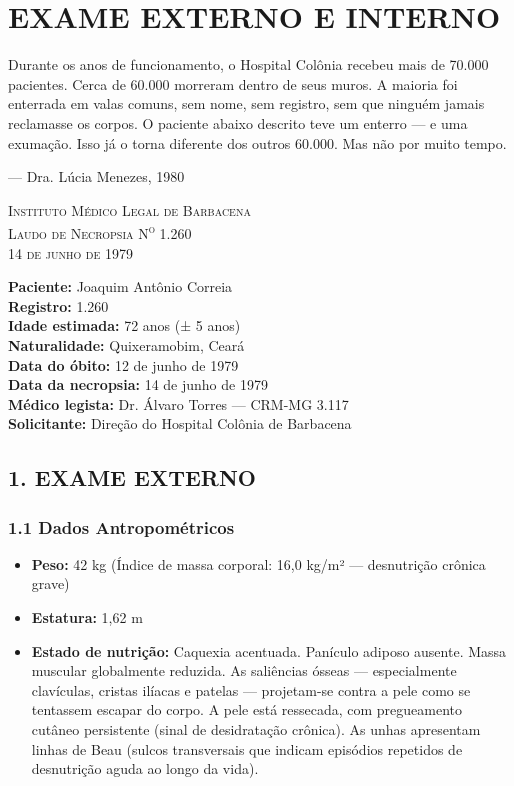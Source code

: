 \chapter{EXAME EXTERNO E INTERNO}

\epigraph{Durante os anos de funcionamento, o Hospital Colônia recebeu mais de 70.000 pacientes. Cerca de 60.000 morreram dentro de seus muros. A maioria foi enterrada em valas comuns, sem nome, sem registro, sem que ninguém jamais reclamasse os corpos. O paciente abaixo descrito teve um enterro --- e uma exumação. Isso já o torna diferente dos outros 60.000. Mas não por muito tempo.}{--- Dra. Lúcia Menezes, 1980}

\vspace{1em}
\begin{center}
\textsc{Instituto Médico Legal de Barbacena} \\
\textsc{Laudo de Necropsia N\textsuperscript{o} 1.260} \\
\textsc{14 de junho de 1979}
\end{center}
\vspace{1em}

\noindent\textbf{Paciente:} Joaquim Antônio Correia \\
\textbf{Registro:} 1.260 \\
\textbf{Idade estimada:} 72 anos (± 5 anos) \\
\textbf{Naturalidade:} Quixeramobim, Ceará \\
\textbf{Data do óbito:} 12 de junho de 1979 \\
\textbf{Data da necropsia:} 14 de junho de 1979 \\
\textbf{Médico legista:} Dr. Álvaro Torres --- CRM-MG 3.117 \\
\textbf{Solicitante:} Direção do Hospital Colônia de Barbacena

\vspace{1em}
\section*{1. EXAME EXTERNO}

\subsection*{1.1 Dados Antropométricos}

\begin{itemize}
    \item \textbf{Peso:} 42 kg (Índice de massa corporal: 16,0 kg/m² --- desnutrição crônica grave)
    \item \textbf{Estatura:} 1,62 m
    \item \textbf{Estado de nutrição:} Caquexia acentuada. Panículo adiposo ausente. Massa muscular globalmente reduzida. As saliências ósseas --- especialmente clavículas, cristas ilíacas e patelas --- projetam-se contra a pele como se tentassem escapar do corpo. A pele está ressecada, com pregueamento cutâneo persistente (sinal de desidratação crônica). As unhas apresentam linhas de Beau (sulcos transversais que indicam episódios repetidos de desnutrição aguda ao longo da vida).
\end{itemize}

